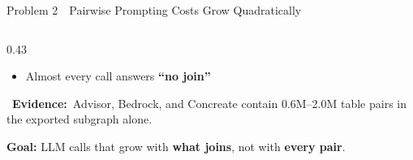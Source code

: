 \documentclass[aspectratio=169]{beamer}
\newcommand{\hred}[1]{\textcolor{tug}{\textbf{#1}}}
\newcommand{\apptitle}[3]{\textcolor{#1}{#2}~\textcolor{black!30}{\textbar}~#3}
\newcommand{\evidence}[1]{{\scriptsize\textcolor{tugb}{\faSearch~\textbf{Evidence:}}~#1}}
\begin{document}
\begin{frame}{\apptitle{tug}{Problem 2}{Pairwise Prompting Costs Grow Quadratically}}
\begin{columns}[T]
\begin{column}{0.43\textwidth}
\begin{itemize}
  \item Almost every call answers \hred{``no join''}
\end{itemize}
\vspace{2mm}
\evidence{Advisor, Bedrock, and Concreate contain 0.6M--2.0M table pairs in the exported subgraph alone.}
\vspace{3mm}
\begin{alertblock}{}
\vspace{0.5mm}
\textbf{Goal:} LLM calls that grow with \textbf{what joins}, not with \textbf{every pair}.
\vspace{0.5mm}
\end{alertblock}
\end{column}
\end{columns}
\end{frame}
\end{document}
